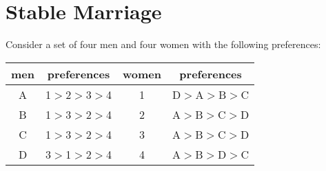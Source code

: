\documentclass[11pt]{article}
\newcommand*{\Question}[1]{\section{#1}}
\begin{document}
\Question{Stable Marriage}

Consider a set of four men and four women with the following preferences:

\begin{center}
\begin{tabular}{|c|c||c|c|}\hline
men&preferences&women & preferences \\
\hline
A& 1$>$2$>$3$>$4&1& D$>$A$>$B$>$C \\
\hline
B&1$>$3$>$2$>$4 &2& A$>$B$>$C$>$D  \\
\hline
C&1$>$3$>$2$>$4 &3& A$>$B$>$C$>$D  \\
\hline
D&3$>$1$>$2$>$4 &4& A$>$B$>$D$>$C  \\
\hline
\end{tabular}
\end{center}
\end{document}
